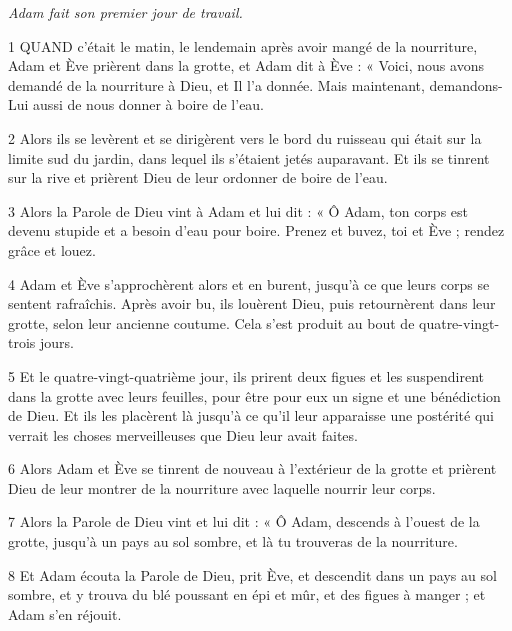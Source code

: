 
\par \textit{Adam fait son premier jour de travail.}

\par 1 QUAND c'était le matin, le lendemain après avoir mangé de la nourriture, Adam et Ève prièrent dans la grotte, et Adam dit à Ève : « Voici, nous avons demandé de la nourriture à Dieu, et Il l'a donnée. Mais maintenant, demandons-Lui aussi de nous donner à boire de l’eau.

\par 2 Alors ils se levèrent et se dirigèrent vers le bord du ruisseau qui était sur la limite sud du jardin, dans lequel ils s'étaient jetés auparavant. Et ils se tinrent sur la rive et prièrent Dieu de leur ordonner de boire de l'eau.

\par 3 Alors la Parole de Dieu vint à Adam et lui dit : « Ô Adam, ton corps est devenu stupide et a besoin d'eau pour boire. Prenez et buvez, toi et Ève ; rendez grâce et louez.

\par 4 Adam et Ève s'approchèrent alors et en burent, jusqu'à ce que leurs corps se sentent rafraîchis. Après avoir bu, ils louèrent Dieu, puis retournèrent dans leur grotte, selon leur ancienne coutume. Cela s'est produit au bout de quatre-vingt-trois jours.

\par 5 Et le quatre-vingt-quatrième jour, ils prirent deux figues et les suspendirent dans la grotte avec leurs feuilles, pour être pour eux un signe et une bénédiction de Dieu. Et ils les placèrent là jusqu'à ce qu'il leur apparaisse une postérité qui verrait les choses merveilleuses que Dieu leur avait faites.

\par 6 Alors Adam et Ève se tinrent de nouveau à l'extérieur de la grotte et prièrent Dieu de leur montrer de la nourriture avec laquelle nourrir leur corps.

\par 7 Alors la Parole de Dieu vint et lui dit : « Ô Adam, descends à l'ouest de la grotte, jusqu'à un pays au sol sombre, et là tu trouveras de la nourriture.

\par 8 Et Adam écouta la Parole de Dieu, prit Ève, et descendit dans un pays au sol sombre, et y trouva du blé poussant en épi et mûr, et des figues à manger ; et Adam s'en réjouit.

